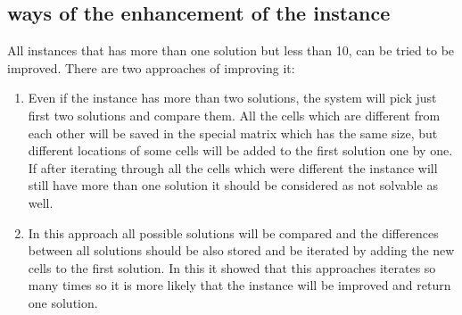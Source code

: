\subsection{ways of the enhancement of the instance}
\label{subsec:enhancemenet_instance}
All instances that has more than one solution but less than 10, can be tried to be improved. There are two approaches of improving it:
\begin{enumerate}
	\item Even if the instance has more than two solutions, the system will pick just first two solutions and compare them. All the cells which are different from each other will be saved in the special matrix which has the same size, but different locations of some cells will be added to the first solution one by one. If after iterating through all the cells which were different the instance will still have more than one solution it should be considered as not solvable as well. 
	\item In this approach all possible solutions will be compared and the differences between all solutions should be also stored and be iterated by adding the new cells to the first solution.  In this it showed that this approaches iterates so many times so it is more likely that the instance will be improved and return one solution.  
\end{enumerate}






